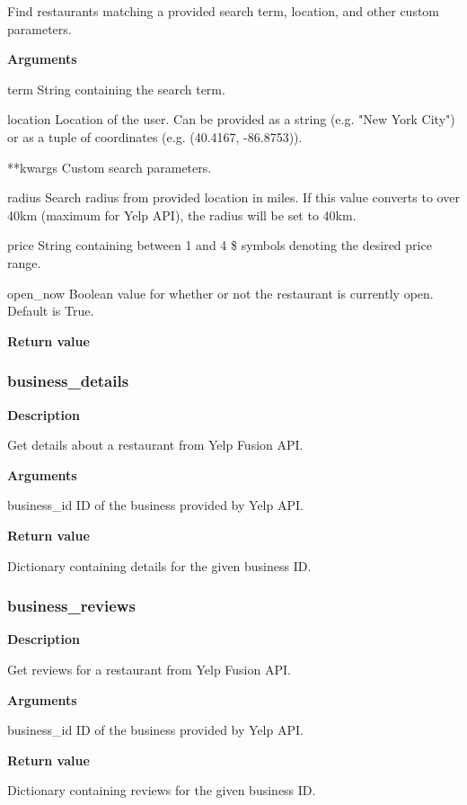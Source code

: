 \documentclass[11pt]{article}
\begin{document}
Find restaurants matching a provided search term, location, and other custom parameters.

\textbf{Arguments}
\begin{deflist}
	\item[term]String containing the search term.
	\item[location]Location of the user. Can be provided as a string (e.g. "New York City") or as a tuple of coordinates (e.g. (40.4167, -86.8753)).
	\item[**kwargs]Custom search parameters.
	\begin{deflist}
		\item[radius]Search radius from provided location in miles. If this value converts to over 40km (maximum for Yelp API), the radius will be set to 40km.
		\item[price]String containing between 1 and 4 \$ symbols denoting the desired price range.
		\item[open\_now]Boolean value for whether or not the restaurant is currently open. Default is True.
	\end{deflist}
\end{deflist}

\textbf{Return value}

\subsubsection{business\_details}
\textbf{Description}

Get details about a restaurant from Yelp Fusion API.

\textbf{Arguments}
\begin{deflist}
	\item[business\_id]ID of the business provided by Yelp API.
\end{deflist}

\textbf{Return value}

Dictionary containing details for the given business ID.

\subsubsection{business\_reviews}
\textbf{Description}

Get reviews for a restaurant from Yelp Fusion API.

\textbf{Arguments}
\begin{deflist}
	\item[business\_id]ID of the business provided by Yelp API.
\end{deflist}

\textbf{Return value}

Dictionary containing reviews for the given business ID.
\end{document}
